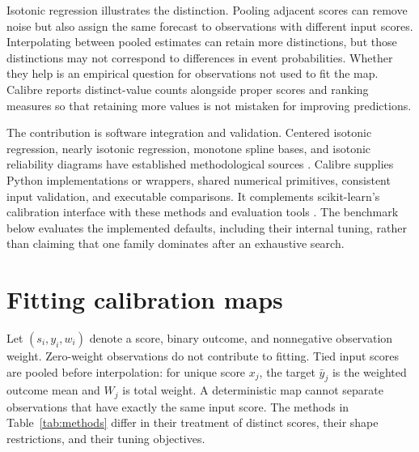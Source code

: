 \documentclass[11pt]{article}
\begin{document}
Isotonic regression illustrates the distinction. Pooling adjacent scores can remove noise but also assign the same forecast to observations with different input scores. Interpolating between pooled estimates can retain more distinctions, but those distinctions may not correspond to differences in event probabilities. Whether they help is an empirical question for observations not used to fit the map. Calibre reports distinct-value counts alongside proper scores and ranking measures so that retaining more values is not mistaken for improving predictions.

The contribution is software integration and validation. Centered isotonic regression, nearly isotonic regression, monotone spline bases, and isotonic reliability diagrams have established methodological sources \citep{oron2017centered,tibshirani2011nearly,ramsay1988monotone,dimitriadis2021stable}. Calibre supplies Python implementations or wrappers, shared numerical primitives, consistent input validation, and executable comparisons. It complements scikit-learn's calibration interface with these methods and evaluation tools \citep{sklearncalibration}. The benchmark below evaluates the implemented defaults, including their internal tuning, rather than claiming that one family dominates after an exhaustive search.

\section{Fitting calibration maps}

Let $(s_i,y_i,w_i)$ denote a score, binary outcome, and nonnegative observation weight. Zero-weight observations do not contribute to fitting. Tied input scores are pooled before interpolation: for unique score $x_j$, the target $\bar y_j$ is the weighted outcome mean and $W_j$ is total weight. A deterministic map cannot separate observations that have exactly the same input score. The methods in Table~\ref{tab:methods} differ in their treatment of distinct scores, their shape restrictions, and their tuning objectives.
\end{document}
